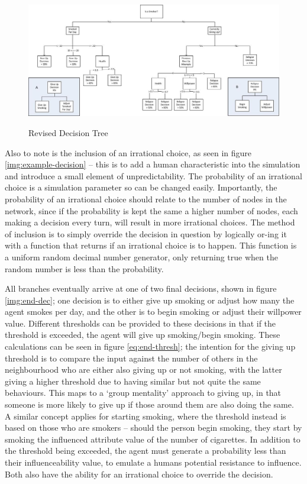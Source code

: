 \documentclass[]{report}
\begin{document}
\begin{landscape}
\begin{figure}
\begin{center}
\includegraphics[width=\paperwidth,keepaspectratio]{DecTreev09.jpg}
\label{img:0.9-dectree}
\caption{Revised Decision Tree}
\end{center}
\end{figure}
\end{landscape}

Also to note is the inclusion of an irrational choice, as seen in figure \ref{img:example-decision} – this is to add a human characteristic into the simulation and introduce a small element of unpredictability. The probability of an irrational choice is a simulation parameter so can be changed easily. Importantly, the probability of an irrational choice should relate to the number of nodes in the network, since if the probability is kept the same a higher number of nodes, each making a decision every turn, will result in more irrational choices. The method of inclusion is to simply override the decision in question by logically or-ing it with a function that returns if an irrational choice is to happen. This function is a uniform random decimal number generator, only returning true when the random number is less than the probability.

All branches eventually arrive at one of two final decisions, shown in figure \ref{img:end-dec}; one decision is to either give up smoking or adjust how many the agent smokes per day, and the other is to begin smoking or adjust their willpower value. Different thresholds can be provided to these decisions in that if the threshold is exceeded, the agent will give up smoking/begin smoking. These calculations can be seen in figure \ref{eq:end-thresh}; the intention for the giving up threshold is to compare the input against the number of others in the neighbourhood who are either also giving up or not smoking, with the latter giving a higher threshold due to having similar but not quite the same behaviours. This maps to a `group mentality' approach to giving up, in that someone is more likely to give up if those around them are also doing the same. A similar concept applies for starting smoking, where the threshold instead is based on those who are smokers – should the person begin smoking, they start by smoking the influenced attribute value of the number of cigarettes. In addition to the threshold being exceeded, the agent must generate a probability less than their influenceability value, to emulate a humans potential resistance to influence. Both also have the ability for an irrational choice to override the decision.
\end{document}

